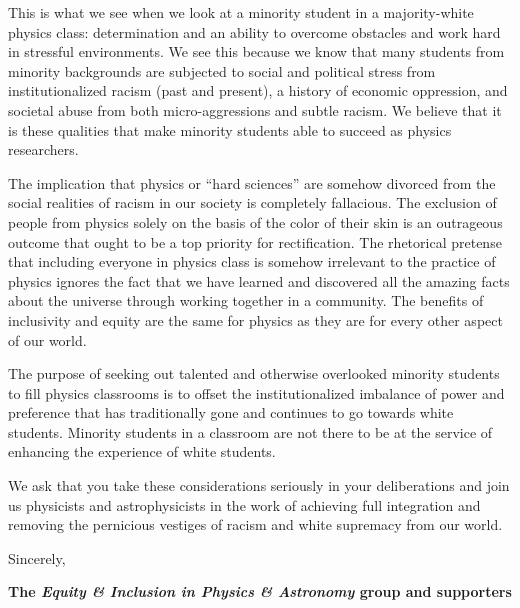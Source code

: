 \documentclass[letterpaper,11pt]{letter}
\begin{document}
This is what we see when we look at a minority student in a majority-white physics class: determination and an ability to overcome obstacles and work hard in stressful environments. We see this because we know that many students from minority backgrounds are subjected to social and political stress from institutionalized racism (past and present), a history of economic oppression, and societal abuse from both micro-aggressions and subtle racism. We believe that it is these qualities that make minority students able to succeed as physics researchers.

The implication that physics or ``hard sciences'' are somehow divorced from the social realities of racism in our society is completely fallacious. The exclusion of people from physics solely on the basis of the color of their skin is an outrageous outcome that ought to be a top priority for rectification. The rhetorical pretense that including everyone in physics class is somehow irrelevant to the practice of physics ignores the fact that we have learned and discovered all the amazing facts about the universe through working together in a community. The benefits of inclusivity and equity are the same for physics as they are for every other aspect of our world.

The purpose of seeking out talented and otherwise overlooked minority students to fill physics classrooms is to offset the institutionalized imbalance of power and preference that has traditionally gone and continues to go towards white students. Minority students in a classroom are not there to be at the service of enhancing the experience of white students. 

We ask that you take these considerations seriously in your deliberations and join us physicists and astrophysicists in the work of achieving full integration and removing the pernicious vestiges of racism and white supremacy from our world.

Sincerely, 

{\bf The {\sl Equity \& Inclusion in Physics \& Astronomy} group and supporters}

\vspace{0.25in}
\end{document}
